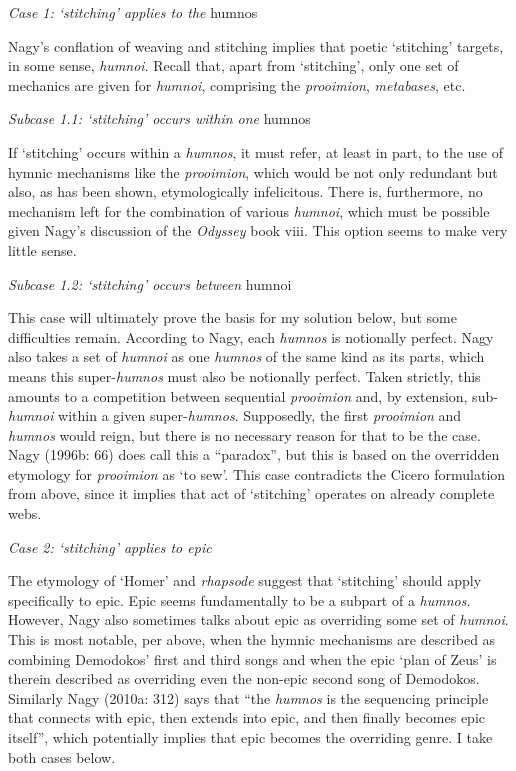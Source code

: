 \documentclass[12pt]{article}
\begin{document}
\noindent \hfill \par
\noindent \textit{Case 1: `stitching' applies to the} humnos

Nagy's conflation of weaving and stitching implies that poetic `stitching' targets, in some sense, \textit{humnoi}. Recall that, apart from `stitching', only one set of mechanics are given for \textit{humnoi}, comprising the \textit{prooimion}, \textit{metabases}, etc.

\noindent \hfill \par
\noindent \textit{Subcase 1.1: `stitching' occurs within one} humnos

If `stitching' occurs within a \textit{humnos}, it must refer, at least in part, to the use of hymnic mechanisms like the \textit{prooimion}, which would be not only redundant but also, as has been shown, etymologically infelicitous. There is, furthermore, no mechanism left for the combination of various \textit{humnoi}, which must be possible given Nagy's discussion of the \textit{Odyssey} book viii. This option seems to make very little sense.

\noindent \hfill \par
\noindent \textit{Subcase 1.2: `stitching' occurs between} humnoi

This case will ultimately prove the basis for my solution below, but some difficulties remain. According to Nagy, each \textit{humnos} is notionally perfect. Nagy also takes a set of \textit{humnoi} as one \textit{humnos} of the same kind as its parts, which means this super-\textit{humnos} must also be notionally perfect. Taken strictly, this amounts to a competition between sequential \textit{prooimion} and, by extension, sub-\textit{humnoi} within a given super-\textit{humnos}. Supposedly, the first \textit{prooimion} and \textit{humnos} would reign, but there is no necessary reason for that to be the case. Nagy (1996b: 66) does call this a ``paradox'', but this is based on the overridden etymology for \textit{prooimion} as `to sew'. This case contradicts the Cicero formulation from above, since it implies that act of `stitching' operates on already complete webs.

\noindent \hfill \par
\noindent \textit{Case 2: `stitching' applies to epic}

The etymology of `Homer' and \textit{rhapsode} suggest that `stitching' should apply specifically to epic. Epic seems fundamentally to be a subpart of a \textit{humnos}. However, Nagy also sometimes talks about epic as overriding some set of \textit{humnoi}. This is most notable, per above, when the hymnic mechanisms are described as combining Demodokos' first and third songs and when the epic `plan of Zeus' is therein described as overriding even the non-epic second song of Demodokos. Similarly Nagy (2010a: 312) says that ``the \textit{humnos} is the sequencing principle that connects with epic, then extends into epic, and then finally becomes epic itself'', which potentially implies that epic becomes the overriding genre. I take both cases below.
\end{document}
